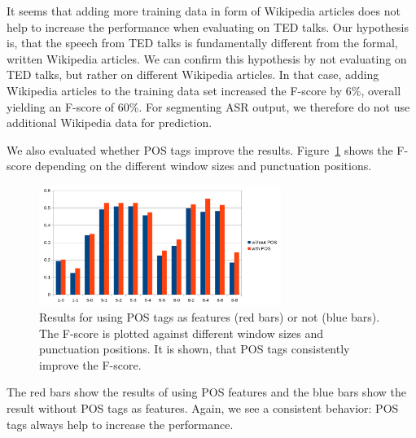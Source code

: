 It seems that adding more training data in form of Wikipedia articles does not help to increase the performance when evaluating on TED talks.
Our hypothesis is, that the speech from TED talks is fundamentally different from the formal, written Wikipedia articles.
We can confirm this hypothesis by not evaluating on TED talks, but rather on different Wikipedia articles.
In that case, adding Wikipedia articles to the training data set increased the F-score by 6\%, overall yielding an F-score of 60\%.
For segmenting ASR output, we therefore do not use additional Wikipedia data for prediction.

We also evaluated whether POS tags improve the results.
Figure~\ref{fig:window_pos_eval} shows the F-score depending on the different window sizes and punctuation positions.
\begin{figure}[ht]
    \centering
    \includegraphics[width=0.7\textwidth]{img/window_pos_eval.png}
    \caption{Results for using POS tags as features (red bars) or not (blue bars). The F-score is plotted against different window sizes and punctuation positions. It is shown, that POS tags consistently improve the F-score.}
    \label{fig:window_pos_eval}
\end{figure}
The red bars show the results of using POS features and the blue bars show the result without POS tags as features.
Again, we see a consistent behavior: POS tags always help to increase the performance.

